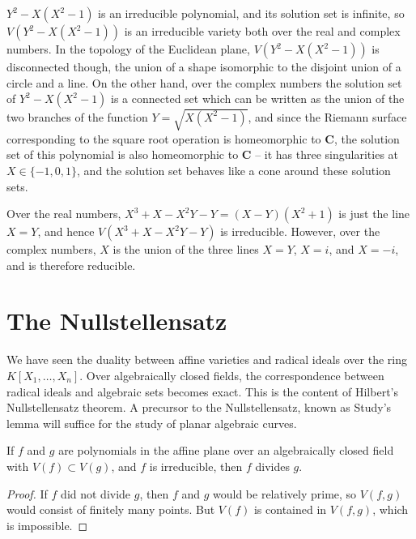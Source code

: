 \begin{example}
    $Y^2 - X(X^2 - 1)$ is an irreducible polynomial, and its solution set is infinite, so $V(Y^2 - X(X^2 - 1))$ is an irreducible variety both over the real and complex numbers. In the topology of the Euclidean plane, $V(Y^2 - X(X^2 - 1))$ is disconnected though, the union of a shape isomorphic to the disjoint union of a circle and a line. On the other hand, over the complex numbers the solution set of $Y^2 - X(X^2 - 1)$ is a connected set which can be written as the union of the two branches of the function $Y = \sqrt{X(X^2 - 1)}$, and since the Riemann surface corresponding to the square root operation is homeomorphic to $\mathbf{C}$, the solution set of this polynomial is also homeomorphic to $\mathbf{C}$ -- it has three singularities at $X \in \{ -1, 0, 1 \}$, and the solution set behaves like a cone around these solution sets.
\end{example}

\begin{example}
    Over the real numbers, $X^3 + X - X^2Y - Y = (X-Y)(X^2 + 1)$ is just the line $X = Y$, and hence $V(X^3 + X - X^2Y - Y)$ is irreducible. However, over the complex numbers, $X$ is the union of the three lines $X = Y$, $X = i$, and $X = -i$, and is therefore reducible.
\end{example}

\section{The Nullstellensatz}

We have seen the duality between affine varieties and radical ideals over the ring $K[X_1, \dots, X_n]$. Over algebraically closed fields, the correspondence between radical ideals and algebraic sets becomes exact. This is the content of Hilbert's Nullstellensatz theorem. A precursor to the Nullstellensatz, known as Study's lemma will suffice for the study of planar algebraic curves.

\begin{theorem}[Study]
    If $f$ and $g$ are polynomials in the affine plane over an algebraically closed field with $V(f) \subset V(g)$, and $f$ is irreducible, then $f$ divides $g$.
\end{theorem}
\begin{proof}
    If $f$ did not divide $g$, then $f$ and $g$ would be relatively prime, so $V(f,g)$ would consist of finitely many points. But $V(f)$ is contained in $V(f,g)$, which is impossible.
\end{proof}

